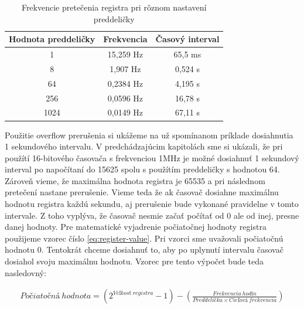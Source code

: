 \begin{table}[!htbp]
    \begin{center}
        \begin{tabular}{|c|c|c|}
            \hline
            Hodnota preddeličky & Frekvencia & Časový interval \\
            \hline
            1                   & 15,259 Hz  & 65,5 ms         \\
            8                   & 1,907 Hz   & 0,524 s         \\
            64                  & 0,2384 Hz  & 4,195 s         \\
            256                 & 0,0596 Hz  & 16,78 s         \\
            1024                & 0,0149 Hz  & 67,11 s         \\
            \hline
        \end{tabular}
        \caption{Frekvencie pretečenia registra pri rôznom nastavení preddeličky}
        \label{table:overflow-frequency}
    \end{center}
\end{table}

Použitie overflow prerušenia si ukážeme na už spomínanom príklade dosiahnutia 1 sekundového intervalu. V predchádzajúcim kapitolách sme si ukázali,
že pri použítí 16-bitového časovača s frekvenciou 1MHz je možné dosiahnuť 1 sekundový interval po napočítaní do 15625 spolu s použítím preddeličky s hodnotou 64.
Zároveň vieme, že maximálna hodnota registra je 65535 a pri následnom pretečení nastane prerušenie. Vieme teda že ak časovač dosiahne maximálnu hodnotu registra každú
sekundu, aj prerušenie bude vykonané pravidelne v tomto intervale. Z toho vyplýva, že časovač nesmie začať počítať od 0 ale od inej, presne danej hodnoty.
Pre matematické vyjadrenie počiatočnej hodnoty registra použijeme vzorec číslo \ref{eq:register-value}. Pri vzorci sme uvažovali počiatočnú hodnotu 0. Tentokrát chceme
dosiahnuť to, aby po uplynutí intervalu časovač dosiahol svoju maximálnu hodnotu. Vzorec pre tento výpočet bude teda nasledovný:

\begin{equation} \label{eq:start-value}
    \begin{aligned}
        Počiatočná\:hodnota =  (2^{Veľkosť\:registra} - 1) - (\frac{Frekvencia\:hodín}{Preddelička \times Cieľová\:frekvencia})
    \end{aligned}
\end{equation}

